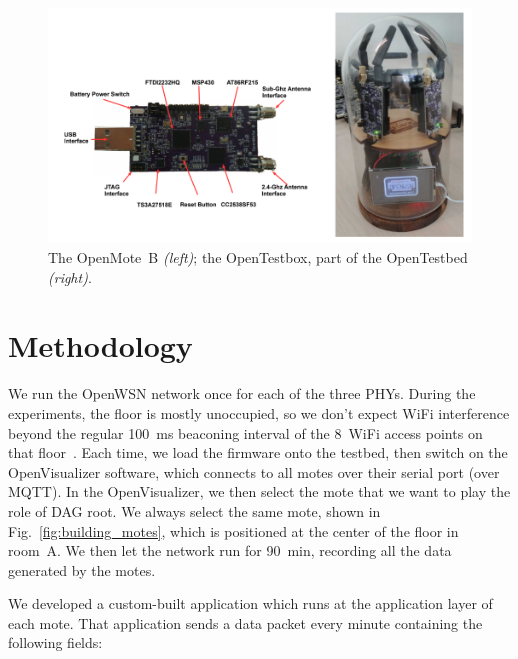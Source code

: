 \documentclass[sensors,article,submit,moreauthors,pdftex]{Definitions/mdpi}
\begin{document}
\begin{figure}
	\centering
	\includegraphics[width=0.90\columnwidth]{mote_ot}
	\caption{
	    The OpenMote~B \textit{(left)}; the OpenTestbox, part of the OpenTestbed \textit{(right)}.
	}
    \label{fig:mote_ot}
\end{figure}

\section{Methodology}
\label{sec:methodology}


We run the OpenWSN network once for each of the three PHYs.
During the experiments, the floor is mostly unoccupied, so we don't expect WiFi interference beyond the regular 100~ms beaconing interval of the 8~WiFi access points on that floor~\cite{munoz18overview}.
Each time, we load the firmware onto the testbed, then switch on the OpenVisualizer software, which connects to all motes over their serial port (over MQTT).
In the OpenVisualizer, we then select the mote that we want to play the role of DAG root.
We always select the same mote, shown in Fig.~\ref{fig:building_motes}, which is positioned at the center of the floor in room~A.
We then let the network run for 90~min, recording all the data generated by the motes.


We developed a custom-built application which runs at the application layer of each mote.
That application sends a data packet every minute containing the following fields:
\end{document}
